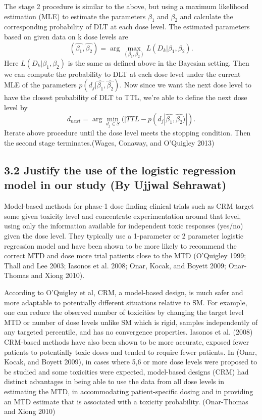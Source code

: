 \documentclass[
]{article}
\begin{document}
The stage 2 procedure is similar to the above, but using a maximum
likelihood estimation (MLE) to estimate the parameters \(\beta_1\) and
\(\beta_2\) and calculate the corresponding probability of DLT at each
dose level. The estimated parameters based on given data on k dose
levels are
\[(\hat{\beta_1},\hat{\beta_2})=\arg\max_{(\beta_1,\beta_2)} L(D_k|\beta_1,\beta_2).\]
Here \(L(D_k|\beta_1,\beta_2)\) is the same as defined above in the
Bayesian setting. Then we can compute the probability to DLT at each
dose level under the current MLE of the parameters
\(p(d_j|\hat{\beta_1},\hat{\beta_2})\). Now since we want the next dose
level to have the closest probability of DLT to TTL, we're able to
define the next dose level by
\[d_{next}=\arg\min_{d_j\in S}(|TTL-p(d_j|\hat{\beta_1},\hat{\beta_2})|).\]
Iterate above procedure until the dose level meets the stopping
condition. Then the second stage terminates.(Wages, Conaway, and
O'Quigley 2013)

\hypertarget{justify-the-use-of-the-logistic-regression-model-in-our-study-by-ujjwal-sehrawat}{%
\subsection{3.2 Justify the use of the logistic regression model in our
study (By Ujjwal
Sehrawat)}\label{justify-the-use-of-the-logistic-regression-model-in-our-study-by-ujjwal-sehrawat}}

Model-based methods for phase-1 dose finding clinical trials such as CRM
target some given toxicity level and concentrate experimentation around
that level, using only the information available for independent toxic
responses (yes/no) given the dose level. They typically use a
1-parameter or 2 parameter logistic regression model and have been shown
to be more likely to recommend the correct MTD and dose more trial
patients close to the MTD (O'Quigley 1999; Thall and Lee 2003; Iasonos
et al. 2008; Onar, Kocak, and Boyett 2009; Onar-Thomas and Xiong 2010).

According to O'Quigley et al, CRM, a model-based design, is much safer
and more adaptable to potentially different situations relative to SM.
For example, one can reduce the observed number of toxicities by
changing the target level MTD or number of dose levels unlike SM which
is rigid, samples independently of any targeted percentile, and has no
convergence properties. Iasonos et al. (2008) CRM-based methods have
also been shown to be more accurate, exposed fewer patients to
potentially toxic doses and tended to require fewer patients. In (Onar,
Kocak, and Boyett 2009), in cases where 5,6 or more dose levels were
proposed to be studied and some toxicities were expected, model-based
designs (CRM) had distinct advantages in being able to use the data from
all dose levels in estimating the MTD, in accommodating patient-specific
dosing and in providing an MTD estimate that is associated with a
toxicity probability. (Onar-Thomas and Xiong 2010)
\end{document}

